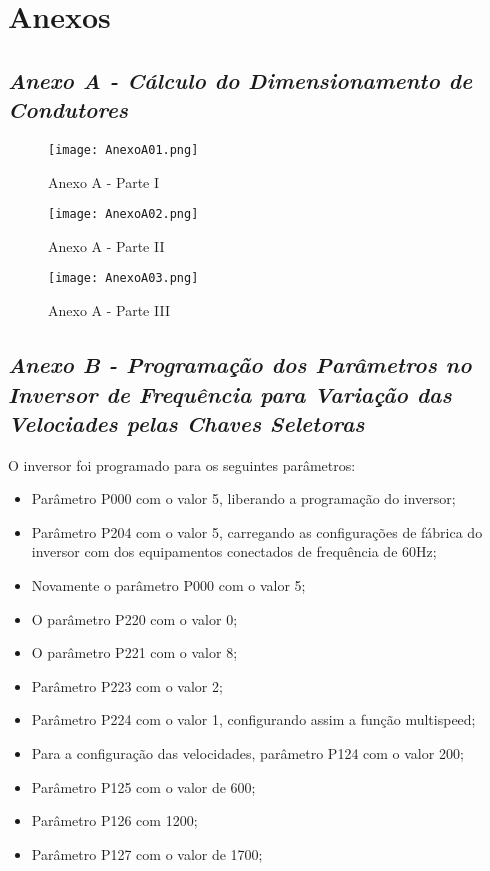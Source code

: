 \chapter[Anexos]{Anexos}
\label{chap:anexos}

	\section[Anexo A]{\emph{Anexo A - Cálculo do Dimensionamento de Condutores}}
	\label{sec:anexoA}

		\begin{figure}[!h]
			\centering
			\texttt{[image: AnexoA01.png]}
			\caption{Anexo A - Parte I} 
			\label{AnexoA01}
		\end{figure}

		\newpage
		\begin{figure}[!h]
			\centering
			\texttt{[image: AnexoA02.png]}
			\caption{Anexo A - Parte II} 
			\label{AnexoA02}
		\end{figure}

		\newpage
		\begin{figure}[!h]
			\centering
			\texttt{[image: AnexoA03.png]}
			\caption{Anexo A - Parte III} 
			\label{AnexoA03}
		\end{figure}

	\newpage
	\section[Anexo B]{\emph{Anexo B - Programação dos Parâmetros no Inversor de Frequência para Variação das Velociades pelas Chaves Seletoras}}
	\label{sec:anexoB}

		O inversor foi programado para os seguintes parâmetros:

		\begin{itemize}
			\item Parâmetro P000 com o valor 5, liberando a programação do inversor;
			\item Parâmetro P204 com o valor 5, carregando as configurações de fábrica do inversor com dos equipamentos conectados de frequência de 60Hz;
			\item Novamente o parâmetro P000 com o valor 5;
			\item O parâmetro P220 com o valor 0;
			\item O parâmetro P221 com o valor 8;
			\item Parâmetro P223 com o valor 2;
			\item Parâmetro P224 com o valor 1, configurando assim a função multispeed;
			\item Para a configuração das velocidades, parâmetro P124 com o valor 200;
			\item Parâmetro P125 com o valor de 600;
			\item Parâmetro P126 com 1200;
			\item Parâmetro P127 com o valor de 1700;
		\end{itemize}

